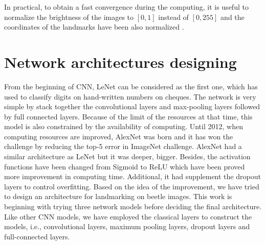 \documentclass[review]{elsarticle}
\begin{document}
In practical, to obtain a fast convergence during the computing, it is useful to normalize the brightness of the images to $[0,1]$ instead of $[0, 255]$ and the coordinates of the landmarks have been also normalized \cite{lecun2012efficient}.

\section{Network architectures designing}
\label{Sneuralnetwork}
From the beginning of CNN, LeNet \cite{lecun1998gradient} can be considered as the first one, which has used to classify digits on hand-written numbers on cheques. The network is very simple by stack together the convolutional layers and max-pooling layers followed by full connected layers. Because of the limit of the resources at that time, this model is also constrained by the availability of computing. Until 2012, when computing resources are improved, AlexNet \cite{krizhevsky2012imagenet} was born and it has won the challenge by reducing the top-5 error in ImageNet challenge. AlexNet had a similar architecture as LeNet but it was deeper, bigger. Besides, the activation functions have been changed from Sigmoid \cite{han1995influence} to ReLU \cite{nair2010rectified} which have been proved more improvement in computing time. Additional, it had supplement the dropout layers to control overfitting. Based on the idea of the improvement, we have tried to design an architecture for landmarking on beetle images. This work is beginning with trying three network models before deciding the final architecture. Like other CNN models, we have employed the classical layers to construct the models, i.e., convolutional layers, maximum pooling layers, dropout layers and full-connected layers.
\end{document}
